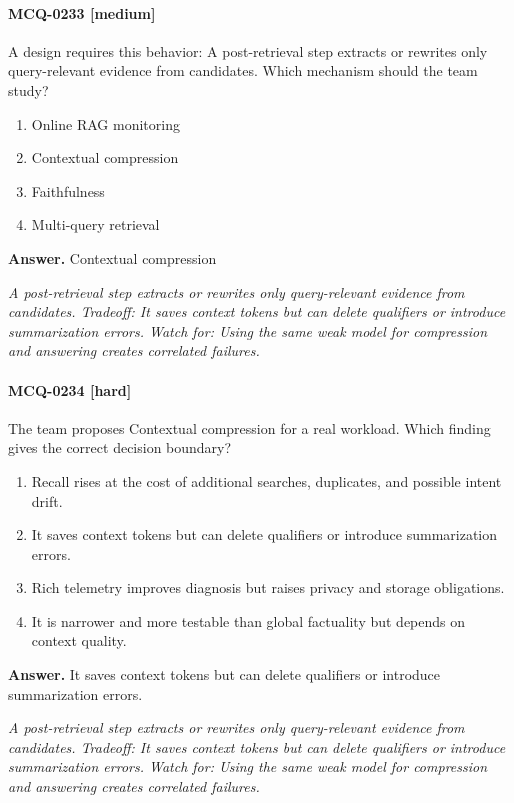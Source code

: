 \paragraph{MCQ-0233 [medium]} A design requires this behavior: A post-retrieval step extracts or rewrites only query-relevant evidence from candidates. Which mechanism should the team study?
\begin{enumerate}[label=\Alph*.]
\item Online RAG monitoring
\item Contextual compression
\item Faithfulness
\item Multi-query retrieval
\end{enumerate}
\noindent\textbf{Answer.} Contextual compression
\par\textit{A post-retrieval step extracts or rewrites only query-relevant evidence from candidates. Tradeoff: It saves context tokens but can delete qualifiers or introduce summarization errors. Watch for: Using the same weak model for compression and answering creates correlated failures.}
\paragraph{MCQ-0234 [hard]} The team proposes Contextual compression for a real workload. Which finding gives the correct decision boundary?
\begin{enumerate}[label=\Alph*.]
\item Recall rises at the cost of additional searches, duplicates, and possible intent drift.
\item It saves context tokens but can delete qualifiers or introduce summarization errors.
\item Rich telemetry improves diagnosis but raises privacy and storage obligations.
\item It is narrower and more testable than global factuality but depends on context quality.
\end{enumerate}
\noindent\textbf{Answer.} It saves context tokens but can delete qualifiers or introduce summarization errors.
\par\textit{A post-retrieval step extracts or rewrites only query-relevant evidence from candidates. Tradeoff: It saves context tokens but can delete qualifiers or introduce summarization errors. Watch for: Using the same weak model for compression and answering creates correlated failures.}
